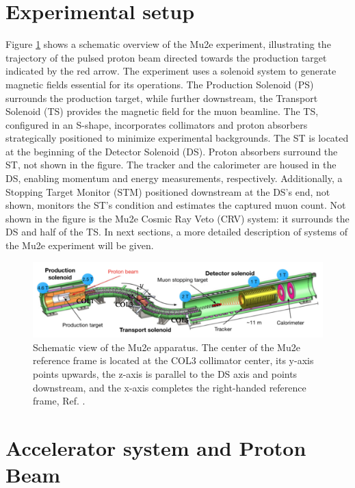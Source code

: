 \section{Experimental setup}\label{setup}
Figure \ref{fig:mu2escheme} shows a schematic overview of the Mu2e experiment, illustrating the trajectory of the pulsed proton beam directed towards the production target indicated by the red arrow. The experiment uses a solenoid system to generate magnetic fields essential for its operations. The Production Solenoid (PS) surrounds the production target, while further downstream, the Transport Solenoid (TS) provides the magnetic field for the muon beamline. The TS, configured in an S-shape, incorporates collimators and proton absorbers strategically positioned to minimize experimental backgrounds. The ST is located at the beginning of the Detector Solenoid (DS). Proton absorbers surround the ST, not shown in the figure. The tracker and the calorimeter are housed in the DS, enabling momentum and energy measurements, respectively. 
Additionally, a Stopping Target Monitor (STM) positioned downstream at the DS's end, not shown, monitors the ST's condition and estimates the captured muon count. Not shown in the figure is the Mu2e Cosmic Ray Veto (CRV) system: it surrounds the DS and half of the TS. In next sections, a more detailed description of systems of the Mu2e experiment will be given.
\begin{figure}[!h]
\centering
\includegraphics[width =\textwidth]{figures/png/Screenshot_20240301_143105.png}
\caption{Schematic view of the Mu2e apparatus. The center of the Mu2e reference frame is located at the COL3 collimator center, its y-axis points upwards, the z-axis is parallel to the DS axis and points downstream, and the x-axis completes the right-handed reference frame, Ref. \cite{universe9010054}.}
\label{fig:mu2escheme}
\end{figure}
\section{Accelerator system and Proton Beam}\label{accel}
